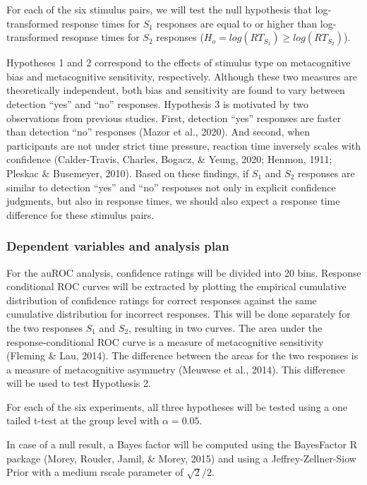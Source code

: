 \documentclass[
  english,
  man,floatsintext]{apa6}
\begin{document}
For each of the six stimulus pairs, we will test the null hypothesis that log-transformed response times for \(S_1\) responses are equal to or higher than log-transformed resopnse times for \(S_2\) responses (\(H_o=log(RT_{S_1})\geq log(RT_{S_2})\)).

Hypotheses 1 and 2 correspond to the effects of stimulus type on metacognitive bias and metacognitive sensitivity, respectively. Although these two measures are theoretically independent, both bias and sensitivity are found to vary between detection \enquote{yes} and \enquote{no} responses. Hypothesis 3 is motivated by two observations from previous studies. First, detection \enquote{yes} responses are faster than detection \enquote{no} responses (Mazor et al., 2020). And second, when participants are not under strict time pressure, reaction time inversely scales with confidence (Calder-Travis, Charles, Bogacz, \& Yeung, 2020; Henmon, 1911; Pleskac \& Busemeyer, 2010). Based on these findings, if \(S_1\) and \(S_2\) responses are similar to detection \enquote{yes} and \enquote{no} responses not only in explicit confidence judgments, but also in response times, we should also expect a response time difference for these stimulus pairs.

\hypertarget{dependent-variables-and-analysis-plan}{%
\subsubsection{Dependent variables and analysis plan}\label{dependent-variables-and-analysis-plan}}

For the auROC analysis, confidence ratings will be divided into 20 bins. Response conditional ROC curves will be extracted by plotting the empirical cumulative distribution of confidence ratings for correct responses against the same cumulative distribution for incorrect responses. This will be done separately for the two responses \(S_1\) and \(S_2\), resulting in two curves. The area under the response-conditional ROC curve is a measure of metacognitive sensitivity (Fleming \& Lau, 2014). The difference between the areas for the two responses is a measure of metacognitive asymmetry (Meuwese et al., 2014). This difference will be used to test Hypothesis 2.

For each of the six experiments, all three hypotheses will be tested using a one tailed t-test at the group level with \(\alpha=0.05\).

In case of a null result, a Bayes factor will be computed using the BayesFactor R package (Morey, Rouder, Jamil, \& Morey, 2015) and using a Jeffrey-Zellner-Siow Prior with a medium rscale parameter of \(\sqrt{2}/2\).
\end{document}
